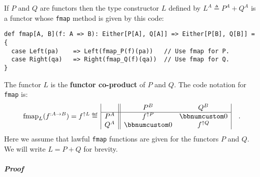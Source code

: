 If $P$ and $Q$ are functors then the type constructor $L$ defined
by $L^{A}\triangleq P^{A}+Q^{A}$ is a functor whose \lstinline!fmap!
method is given by this code:
\begin{lstlisting}
def fmap[A, B](f: A => B): Either[P[A], Q[A]] => Either[P[B], Q[B]] = {
  case Left(pa)    => Left(fmap_P(f)(pa))   // Use fmap for P.
  case Right(qa)   => Right(fmap_Q(f)(qa))  // Use fmap for Q.
}
\end{lstlisting}
The functor $L$ is the \textbf{functor co-product}
of $P$ and $Q$. The code notation for \lstinline!fmap!  is:
\[
\text{fmap}_{L}(f^{:A\rightarrow B})=f^{\uparrow L}\triangleq\,\begin{array}{|c||cc|}
 & P^{B} & Q^{B}\\
\hline P^{A} & f^{\uparrow P} & \bbnum 0\\
Q^{A} & \bbnum 0 & f^{\uparrow Q}
\end{array}\quad.
\]
Here we assume that lawful \lstinline!fmap! functions are given for
the functors $P$ and $Q$. We will write $L=P+Q$ for brevity.

\subparagraph{Proof}

